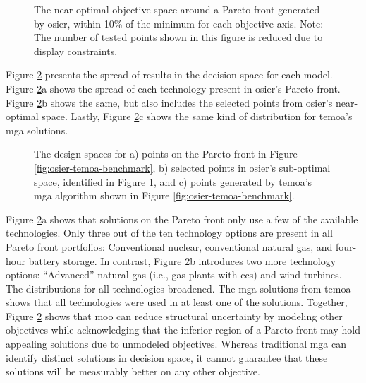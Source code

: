\begin{figure}[ht!]
    \begin{center}
        \resizebox{\columnwidth}{!}{}
        \caption{The near-optimal objective space around a Pareto front
        generated by \gls{osier}, within 10\% of the minimum for each objective
        axis. Note: The number of tested points shown in this figure is reduced
        due to display constraints.}
        \label{fig:osier-near-optimal}
    \end{center}
\end{figure}

Figure \ref{fig:temoa-benchmark-03} presents the spread of results in the
decision space for each model. Figure \ref{fig:temoa-benchmark-03}a shows the
spread of each technology present in \gls{osier}'s Pareto front. Figure
\ref{fig:temoa-benchmark-03}b shows the same, but also includes the selected
points from \gls{osier}'s near-optimal space. Lastly, Figure
\ref{fig:temoa-benchmark-03}c shows the same kind of distribution for
\gls{temoa}'s \gls{mga} solutions.

\begin{figure}[ht!]
  \centering
  \resizebox{\columnwidth}{!}{}
  \caption{The design spaces for a) points on the Pareto-front in Figure
  \ref{fig:osier-temoa-benchmark}, b) selected points in \gls{osier}'s
  sub-optimal space, identified in Figure \ref{fig:osier-near-optimal}, and c)
  points generated by \gls{temoa}'s \gls{mga} algorithm shown in Figure
  \ref{fig:osier-temoa-benchmark}.}
  \label{fig:temoa-benchmark-03}
\end{figure}

Figure \ref{fig:temoa-benchmark-03}a shows that solutions on the Pareto front
only use a few of the available technologies. Only three out of the ten
technology options are present in all Pareto front portfolios: Conventional
nuclear, conventional natural gas, and four-hour battery storage. In contrast,
Figure \ref{fig:temoa-benchmark-03}b introduces two more technology options:
``Advanced'' natural gas (i.e., gas plants with \gls{ccs}) and wind turbines.
The distributions for all technologies broadened. The \gls{mga} solutions from
\gls{temoa} shows that all technologies were used in at least one of the
solutions. Together, Figure \ref{fig:temoa-benchmark-03} shows that \gls{moo}
can reduce structural uncertainty by modeling other objectives while
acknowledging that the inferior region of a Pareto front may hold appealing
solutions due to unmodeled objectives. Whereas traditional \gls{mga} can
identify distinct solutions in decision space, it cannot guarantee that these
solutions will be measurably better on any other objective.

